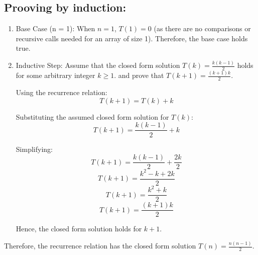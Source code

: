 \documentclass{article}
\begin{document}
\subsection*{Prooving by induction:}
\begin{enumerate}
    \item Base Case (n = 1):
          When \( n = 1 \), \( T(1) = 0 \) (as there are no comparisons or recursive calls needed for an array of size 1).
          Therefore, the base case holds true.

    \item Inductive Step:
          Assume that the closed form solution \( T(k) = \frac{k(k-1)}{2} \) holds for some arbitrary integer \( k \geq 1 \).
          and prove that \( T(k+1) = \frac{(k+1)k}{2} \).

          Using the recurrence relation:
          \[ T(k+1) = T(k) + k \]

          Substituting the assumed closed form solution for \( T(k) \):
          \[ T(k+1) = \frac{k(k-1)}{2} + k \]

          Simplifying:
          \[ T(k+1) = \frac{k(k-1)}{2} + \frac{2k}{2} \]
          \[ T(k+1) = \frac{k^2 - k + 2k}{2} \]
          \[ T(k+1) = \frac{k^2 + k}{2} \]
          \[ T(k+1) = \frac{(k+1)k}{2} \]

          Hence, the closed form solution holds for \( k+1 \).

\end{enumerate}
Therefore, the recurrence relation has the closed form solution \( T(n) = \frac{n(n-1)}{2} \).
\newpage
\end{document}
